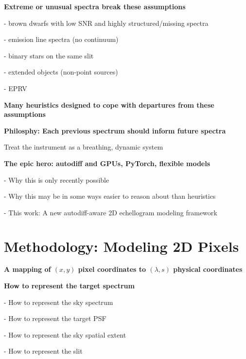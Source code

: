 \documentclass[twocolumn]{aastex63}
\begin{document}
\begin{mdframed}
  \textbf{Extreme or unusual spectra break these assumptions} \par
  - brown dwarfs with low SNR and highly structured/missing spectra\par
  - emission line spectra (no continuum)\par
  - binary stars on the same slit\par
  - extended objects (non-point sources)\par
  - EPRV\par
\end{mdframed}

\begin{mdframed}
  \textbf{Many heuristics designed to cope with departures from these assumptions} \par
  \textcolor{lightgray}{\lipsum[4]}
\end{mdframed}

\begin{mdframed}
  \textbf{Philosphy: Each previous spectrum should inform future spectra} \par
  Treat the instrument as a breathing, dynamic system\par
  \textcolor{lightgray}{\lipsum[5]}
\end{mdframed}

\begin{mdframed}
  \textbf{The epic hero: autodiff and GPUs, PyTorch, flexible models} \par
  - Why this is only recently possible\par
  - Why this may be in some ways easier to reason about than heuristics\par
  - This work: A new autodiff-aware 2D echellogram modeling framework\par
  \textcolor{lightgray}{\lipsum[6]}
\end{mdframed}


\section{Methodology: Modeling 2D Pixels}

\begin{mdframed}
  \textbf{A mapping of $(x, y)$ pixel coordinates to $(\lambda, s)$ physical coordinates} \par
  \textcolor{lightgray}{\lipsum[7]}
\end{mdframed}

\begin{mdframed}
  \textbf{How to represent the target spectrum} \par
  - How to represent the sky spectrum\par
  - How to represent the target PSF\par
  - How to represent the sky spatial extent\par
  - How to represent the slit\par
\end{mdframed}
\end{document}
